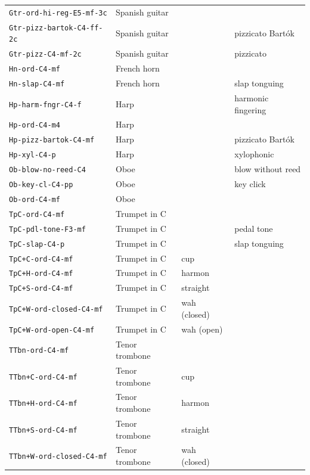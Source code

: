 \documentclass{bmcart}
\begin{document}
\begin{backmatter}
\begin{table}
\begin{tabular}{llll}
        \texttt{Gtr-ord-hi-reg-E5-mf-3c} & Spanish guitar & & \\
        \texttt{Gtr-pizz-bartok-C4-ff-2c} & Spanish guitar & & pizzicato Bart\'ok\\
        \texttt{Gtr-pizz-C4-mf-2c} & Spanish guitar &  & pizzicato \\ \hline
        \texttt{Hn-ord-C4-mf} & French horn & & \\
        \texttt{Hn-slap-C4-mf} & French horn & & slap tonguing \\ \hline
        \texttt{Hp-harm-fngr-C4-f} & Harp & & harmonic fingering \\
        \texttt{Hp-ord-C4-m4} & Harp & & \\
        \texttt{Hp-pizz-bartok-C4-mf} & Harp & & pizzicato Bart\'ok \\
        \texttt{Hp-xyl-C4-p} & Harp & & xylophonic \\ \hline
        \texttt{Ob-blow-no-reed-C4} & Oboe & & blow without reed \\
        \texttt{Ob-key-cl-C4-pp} & Oboe & & key click \\
        \texttt{Ob-ord-C4-mf} & Oboe & & \\ \hline
        \texttt{TpC-ord-C4-mf} & Trumpet in C & & \\
        \texttt{TpC-pdl-tone-F3-mf} & Trumpet in C & & pedal tone \\
        \texttt{TpC-slap-C4-p} & Trumpet in C & & slap tonguing \\
        \texttt{TpC+C-ord-C4-mf} & Trumpet in C & cup & \\
        \texttt{TpC+H-ord-C4-mf} & Trumpet in C & harmon & \\
        \texttt{TpC+S-ord-C4-mf} & Trumpet in C & straight & \\
        \texttt{TpC+W-ord-closed-C4-mf} & Trumpet in C & wah (closed) & \\
        \texttt{TpC+W-ord-open-C4-mf} & Trumpet in C & wah (open) & \\ \hline
        \texttt{TTbn-ord-C4-mf} & Tenor trombone & &  \\
        \texttt{TTbn+C-ord-C4-mf} & Tenor trombone & cup & \\
        \texttt{TTbn+H-ord-C4-mf} & Tenor trombone & harmon & \\
        \texttt{TTbn+S-ord-C4-mf} & Tenor trombone & straight & \\
        \texttt{TTbn+W-ord-closed-C4-mf} & Tenor trombone & wah (closed) & \\

\end{tabular}
\end{table}
\end{backmatter}
\end{document}
